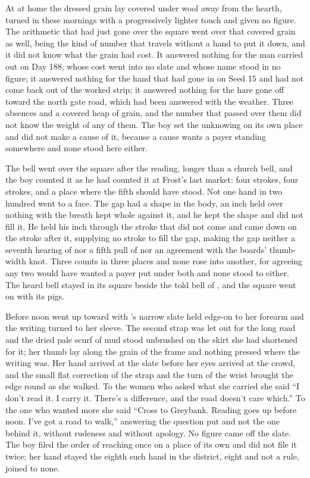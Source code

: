 At  at home the dressed grain lay covered under wool away from the hearth, turned in these mornings with a progressively lighter touch and given no figure. The arithmetic that had just gone over the square went over that covered grain as well, being the kind of number that travels without a hand to put it down, and it did not know what the grain had cost. It answered nothing for the man carried out on Day 188, whose cost went into no slate and whose name stood in no figure; it answered nothing for the hand that had gone in on Seed 15 and had not come back out of the worked strip; it answered nothing for the hare gone off toward the north gate road, which had been answered with the weather. Three absences and a covered heap of grain, and the number that passed over them did not know the weight of any of them. The boy set the unknowing on its own place and did not make a cause of it, because a cause wants a payer standing somewhere and none stood here either.

The bell went over the square after the reading, longer than a church bell, and the boy counted it as he had counted it at Frost's last market: four strokes, four strokes, and a place where the fifth should have stood. Not one hand in two hundred went to a face. The gap had a shape in the body, an inch held over nothing with the breath kept whole against it, and he kept the shape and did not fill it. He held his inch through the stroke that did not come and came down on the stroke after it, supplying no stroke to fill the gap, making the gap neither a seventh hearing of  nor a fifth pull of  nor an agreement with the boards' thumb-width knot. Three counts in three places and none rose into another, for agreeing any two would have wanted a payer put under both and none stood to either. The heard bell stayed in its square beside the told bell of , and the square went on with its pigs.

Before noon  went up  toward  with 's narrow slate held edge-on to her forearm and the writing turned to her sleeve. The second strap was let out for the long road and the dried pale scurf of mud stood unbrushed on the skirt she had shortened for it; her thumb lay along the grain of the frame and nothing pressed where the writing was. Her hand arrived at the slate before her eyes arrived at the crowd, and the small flat correction of the strap and the turn of the wrist brought the edge round as she walked. To the women who asked what she carried she said “I don't read it. I carry it. There's a difference, and the road doesn't care which.” To the one who wanted more she said “Cross to Greybank. Reading goes up before noon. I've got a road to walk,” answering the question put and not the one behind it, without rudeness and without apology. No figure came off the slate. The boy filed the order of reaching once on a place of its own and did not file it twice; her hand stayed the eighth such hand in the district, eight and not a rule, joined to none.

